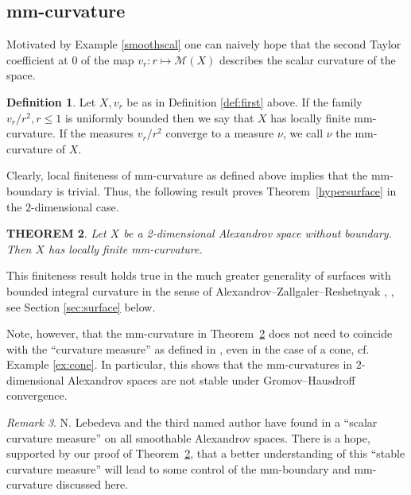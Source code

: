 \documentclass[12pt,leqno]{amsart}
\numberwithin{equation}{section}
\newtheorem{thm}{THEOREM}[section]
\theoremstyle{definition}
\newtheorem{defn}[thm]{Definition}%
\theoremstyle{remark}
\newtheorem{rem}[thm]{Remark}
\newcommand{\tref}[1]{Theorem~\ref{#1}}
\begin{document}
\subsection{mm-curvature} \label{subsec:curv}
Motivated by Example \ref{smoothscal} one can naively hope that the second Taylor coefficient at $0$ of the
map $v_r\colon r\mapsto \mathcal M(X)$ describes the scalar curvature of the space.



\begin{defn}
 Let $X,v_r$ be as  in Definition \ref{def:first} above. If the family $v_r /r^2, r\leq 1$ is uniformly  bounded then we say that $X$ has locally finite  mm-curvature.
  If the measures $v_r /r^2$  converge to a measure $\nu$, we call $\nu$ the mm-curvature of $X$.
\end{defn}

Clearly, local finiteness of mm-curvature as defined above implies that the mm-boundary is trivial.
Thus, the following result proves \tref{hypersurface} in the $2$-dimensional case.


\begin{thm} \label{intsurface}
 Let $X$ be a 2-dimensional Alexandrov space without boundary.
 Then $X$ has locally finite mm-curvature.
\end{thm}


This finiteness result holds true in the much greater generality of surfaces  with bounded integral curvature in the sense of Alexandrov--Zallgaler--Reshetnyak \cite{Reshetnyak-GeomIV}, \cite{AZ}, see Section \ref{sec:surface} below.

Note, however, that the mm-curvature
in \tref{intsurface} does not need to coincide with the ``curvature measure'' as  defined in \cite{AZ},   even in the case of a cone, cf. Example \ref{ex:cone}.  In particular, this shows that the mm-curvatures in $2$-dimensional Alexandrov spaces are not stable under Gromov--Hausdroff convergence.


\begin{rem}
N. Lebedeva and the third named author have found in \cite{LP}  a ``scalar curvature measure'' on all smoothable Alexandrov spaces.
There is a hope, supported by our proof of  \tref{intsurface}, that a better understanding of this ``stable curvature measure'' will
lead to some control of the   mm-boundary and mm-curvature discussed here.   
\end{rem}
\end{document}
